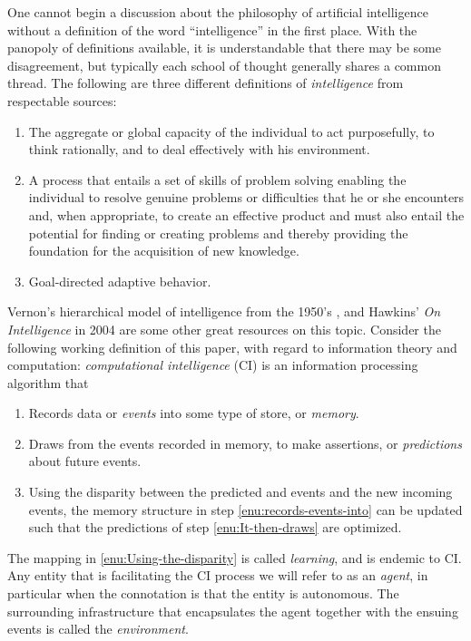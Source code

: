 \documentclass[english]{article}
\begin{document}
One cannot begin a discussion about the philosophy of artificial intelligence
without a definition of the word ``intelligence'' in the first place.
With the panopoly of definitions available, it is understandable that
there may be some disagreement, but typically each school of thought
generally shares a common thread. The following are three different
definitions of \emph{intelligence} from respectable sources:
\begin{enumerate}
\item The aggregate or global capacity of the individual to act purposefully,
to think rationally, and to deal effectively with his environment\cite{we}.
\item A process that entails a set of skills of problem solving \textemdash{}
enabling the individual to resolve genuine problems or difficulties
that he or she encounters and, when appropriate, to create an effective
product \textemdash{} and must also entail the potential for finding
or creating problems \textemdash{} and thereby providing the foundation
for the acquisition of new knowledge\cite{ga}.
\item Goal-directed adaptive behavior\cite{ste}.
\end{enumerate}
Vernon's hierarchical model of intelligence from the 1950's \cite{aik},
and Hawkins' \emph{On Intelligence} in 2004 \cite{haw} are some other
great resources on this topic. Consider the following working definition
of this paper, with regard to information theory and computation:
\emph{computational intelligence }(CI) is an information processing
algorithm that 
\begin{enumerate}
\item Records data or \emph{events} into some type of store, or \emph{memory}.
\label{enu:records-events-into}
\item Draws from the events recorded in memory, to make assertions, or \emph{predictions}
about future events. \label{enu:It-then-draws}
\item Using the disparity between the predicted and events and the new incoming
events, the memory structure in step \ref{enu:records-events-into}
can be updated such that the predictions of step \ref{enu:It-then-draws}
are optimized. \label{enu:Using-the-disparity}
\end{enumerate}
The mapping in \ref{enu:Using-the-disparity} is called \emph{learning},
and is endemic to CI. Any entity that is facilitating the CI process
we will refer to as an \emph{agent}, in particular when the connotation
is that the entity is autonomous. The surrounding infrastructure that
encapsulates the agent together with the ensuing events is called
the \emph{environment}.
\end{document}
